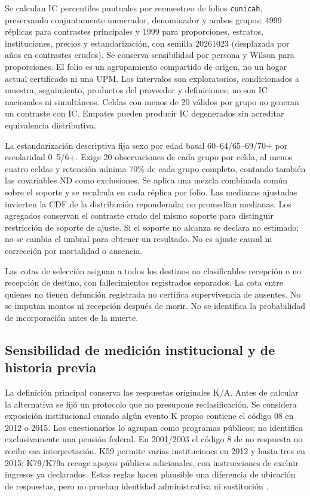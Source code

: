 Se calculan IC percentiles puntuales por remuestreo de folios \texttt{cunicah}, preservando conjuntamente numerador, denominador y ambos grupos: 4999 réplicas para contrastes principales y 1999 para proporciones, estratos, instituciones, precios y estandarización, con semilla 20261023 (desplazada por años en contrastes crudos). Se conserva sensibilidad por persona y Wilson para proporciones. El folio es un agrupamiento compartido de origen, no un hogar actual certificado ni una UPM. Los intervalos son exploratorios, condicionados a muestra, seguimiento, productos del proveedor y definiciones; no son IC nacionales ni simultáneos. Celdas con menos de 20 válidos por grupo no generan un contraste con IC. Empates pueden producir IC degenerados sin acreditar equivalencia distributiva.

La estandarización descriptiva fija sexo por edad basal 60--64/65--69/70+ por escolaridad 0--5/6+. Exige 20 observaciones de cada grupo por celda, al menos cuatro celdas y retención mínima 70\% de cada grupo completo, contando también las covariables ND como exclusiones. Se aplica una mezcla combinada común sobre el soporte y se recalcula en cada réplica por folio. Las medianas ajustadas invierten la CDF de la distribución reponderada; no promedian medianas. Los agregados conservan el contraste crudo del mismo soporte para distinguir restricción de soporte de ajuste. Si el soporte no alcanza se declara no estimado; no se cambia el umbral para obtener un resultado. No es ajuste causal ni corrección por mortalidad o ausencia.

Las cotas de selección asignan a todos los destinos no clasificables recepción o no recepción de destino, con fallecimientos registrados separados. La cota entre quienes no tienen defunción registrada no certifica supervivencia de ausentes. No se imputan montos ni recepción después de morir. No se identifica la probabilidad de incorporación antes de la muerte.


\subsection{Sensibilidad de medición institucional y de historia previa}
\label{sec:sensibilidad-medicion}

La definición principal conserva las respuestas originales K/A. Antes de
calcular la alternativa se fijó un protocolo que no presupone reclasificación.
Se considera exposición institucional cuando algún evento K propio contiene
el código 08 en 2012 o 2015. Los cuestionarios lo agrupan como programas
públicos; no identifica exclusivamente una pensión federal. En 2001/2003 el
código 8 de no respuesta no recibe esa interpretación. K59 permite varias
instituciones en 2012 y hasta tres en 2015; K79/K79a recoge apoyos públicos
adicionales, con instrucciones de excluir ingresos ya declarados. Estas
reglas hacen plausible una diferencia de ubicación de respuestas, pero no
prueban identidad administrativa ni sustitución
\citep[pp.~98 y 101 del PDF]{enasem2012cuestionario}
\citep[pp.~99 y 102 del PDF]{enasem2015cuestionario}.

